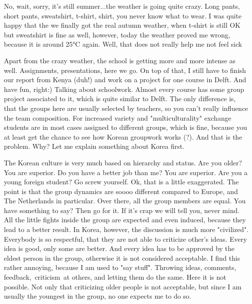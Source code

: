 \begin{post}
	\begin{content}
No, wait, sorry, it's still summer...the weather is going quite crazy. Long pants, short pants, sweatshirt, t-shirt, shirt, you never know what to wear. I was quite happy that the we finally got the real autumn weather, when t-shirt is still OK but sweatshirt is fine as well, however, today the weather proved me wrong, because it is around 25°C again. Well, that does not really help me not feel sick



Apart from the crazy weather, the school is getting more and more intense as well. Assignments, presentations, here we go. On top of that, I still have to finish our report from Kenya (duh!) and work on a project for one course in Delft. And have fun, right:) Talking about schoolwork. Almost every course has some group project associated to it, which is quite similar to Delft. The only difference is, that the groups here are usually selected by teachers, so you can't really influence the team composition. For increased variety and "multiculturality" exchange students are in most cases assigned to different groups, which is fine, because you at least get the chance to see how Korean groupwork works (?). And that is the problem. Why? Let me explain something about Korea first.



The Korean culture is very much based on hierarchy and status. Are you older? You are superior. Do you have a better job than me? You are superior. Are you a young foreign student? Go screw yourself. Ok, that is a little exaggerated. The point is that the group dynamics are soooo different compared to Europe, and The Netherlands in particular. Over there, all the group members are equal. You have something to say? Then go for it. If it's crap we will tell you, never mind. All the little fights inside the group are expected and even induced, because they lead to a better result. In Korea, however, the discussion is much more "civilized". Everybody is so respectful, that they are not able to criticize other's ideas. Every idea is good, only some are better. And every idea has to be approved by the eldest person in the group, otherwise it is not considered acceptable. I find this rather annoying, because I am used to "say stuff". Throwing ideas, comments, feedback, criticism at others, and letting them do the same. Here it is not possible. Not only that criticizing older people is not acceptable, but since I am usually the youngest in the group, no one expects me to do so.




\end{content}
\end{post}
